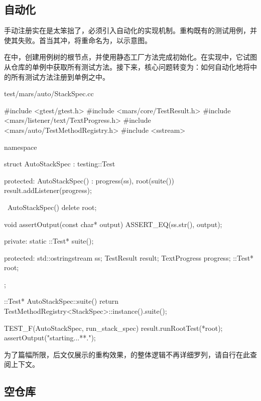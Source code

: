 \begin{content}

\subsection{自动化}

手动注册实在是太笨拙了，必须引入自动化的实现机制。重构既有的测试用例，并使其失败。首当其冲，将重命名为，以示意图。

在中，创建用例树的根节点，并使用静态工厂方法完成初始化。在实现中，它试图从仓库的单例中获取所有测试方法。接下来，核心问题转变为：如何自动化地将中的所有测试方法注册到单例之中。

\begin{nodiff}{test/mars/auto/StackSpec.cc}
 \begin{c++}
#include <gtest/gtest.h>
#include <mars/core/TestResult.h>
#include <mars/listener/text/TextProgress.h>
#include <mars/auto/TestMethodRegistry.h>
#include <sstream>

namespace {
  struct AutoStackSpec : testing::Test {
  protected:
    AutoStackSpec() : progress(ss), root(suite()) {
      result.addListener(progress);
    }

    ~AutoStackSpec() {
      delete root;
    }

    void assertOutput(const char* output) {
      ASSERT_EQ(ss.str(), output);
    }

  private:
    static ::Test* suite();

  protected:
    std::ostringstream ss;
    TestResult result;
    TextProgress progress;
    ::Test* root;
  };
  
  ::Test* AutoStackSpec::suite() {
    return TestMethodRegistry<StackSpec>::instance().suite();
  }
}

TEST_F(AutoStackSpec, run_stack_spec) {
  result.runRootTest(*root);
  assertOutput("starting...\n***\nend.\n");
}
 \end{c++}
\end{nodiff}

为了篇幅所限，后文仅展示的重构效果，的整体逻辑不再详细罗列，请自行在此查阅上下文。

\subsection{空仓库}


\end{content}
